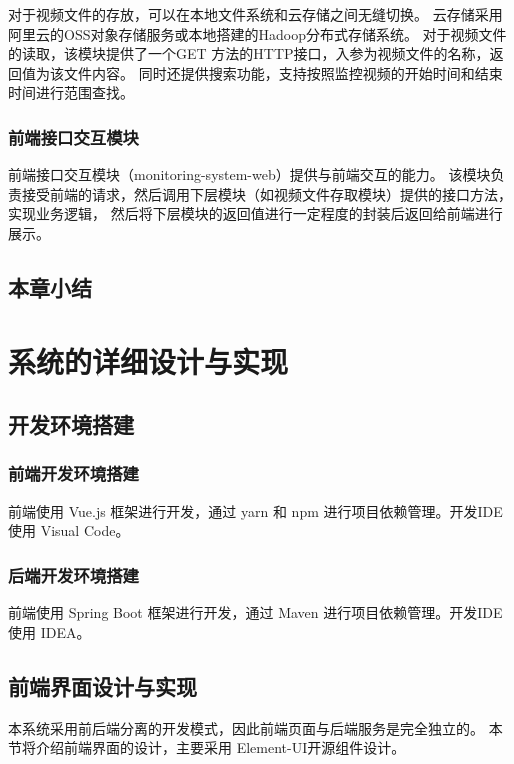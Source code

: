 对于视频文件的存放，可以在本地文件系统和云存储之间无缝切换。
云存储采用阿里云的OSS对象存储服务或本地搭建的Hadoop分布式存储系统。
对于视频文件的读取，该模块提供了一个GET 方法的HTTP接口，入参为视频文件的名称，返回值为该文件内容。
同时还提供搜索功能，支持按照监控视频的开始时间和结束时间进行范围查找。


\subsection{前端接口交互模块}
前端接口交互模块（monitoring-system-web）提供与前端交互的能力。
该模块负责接受前端的请求，然后调用下层模块（如视频文件存取模块）提供的接口方法，实现业务逻辑，
然后将下层模块的返回值进行一定程度的封装后返回给前端进行展示。






\section{本章小结}

\chapter{系统的详细设计与实现}
\section{开发环境搭建}
\subsection{前端开发环境搭建}
前端使用 Vue.js 框架进行开发，通过 yarn 和 npm 进行项目依赖管理。开发IDE使用 Visual Code。 

\subsection{后端开发环境搭建}
前端使用 Spring Boot 框架进行开发，通过 Maven 进行项目依赖管理。开发IDE使用 IDEA。 

\section{前端界面设计与实现}
本系统采用前后端分离的开发模式，因此前端页面与后端服务是完全独立的。
本节将介绍前端界面的设计，主要采用 Element-UI开源组件设计。

